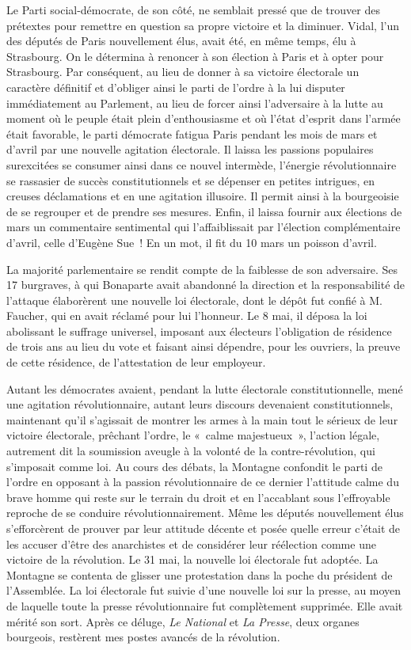 \documentclass[french,twoside]{book} %
\begin{document}
Le Parti social-démocrate, de son côté, ne semblait pressé que de trouver des prétextes pour remettre en question sa propre victoire et la diminuer. Vidal, l’un des députés de Paris nouvellement élus, avait été, en même temps, élu à Strasbourg. On le détermina à renoncer à son élection à Paris et à opter pour Strasbourg. Par conséquent, au lieu de donner à sa victoire électorale un caractère définitif et d’obliger ainsi le parti de l’ordre à la lui disputer immédiatement au Parlement, au lieu de forcer ainsi l’adversaire à la lutte au moment où le peuple était plein d’enthousiasme et où l’état d’esprit dans l’armée était favorable, le parti démocrate fatigua Paris pendant les mois de mars et d’avril par une nouvelle agitation électorale. Il laissa les passions populaires surexcitées se consumer ainsi dans ce nouvel intermède, l’énergie révolutionnaire se rassasier de succès constitutionnels et se dépenser en petites intrigues, en creuses déclamations et en une agitation illusoire. Il permit ainsi à la bourgeoisie de se regrouper et de prendre ses mesures. Enfin, il laissa fournir aux élections de mars un commentaire sentimental qui l’affaiblissait par l’élection complémentaire d’avril, celle d’Eugène Sue ! En un mot, il fit du 10 mars un poisson d’avril.\par
La majorité parlementaire se rendit compte de la faiblesse de son adversaire. Ses 17 burgraves, à qui Bonaparte avait abandonné la direction et la responsabilité de l’attaque élaborèrent une nouvelle loi électorale, dont le dépôt fut confié à M. Faucher, qui en avait réclamé pour lui l’honneur. Le 8 mai, il déposa la loi abolissant le suffrage universel, imposant aux électeurs l’obligation de résidence de trois ans au lieu du vote et faisant ainsi dépendre, pour les ouvriers, la preuve de cette résidence, de l’attestation de leur employeur.\par
Autant les démocrates avaient, pendant la lutte électorale constitutionnelle, mené une agitation révolutionnaire, autant leurs discours devenaient constitutionnels, maintenant qu’il s’agissait de montrer les armes à la main tout le sérieux de leur victoire électorale, prêchant l’ordre, le « calme majestueux », l’action légale, autrement dit la soumission aveugle à la volonté de la contre-révolution, qui s’imposait comme loi. Au cours des débats, la Montagne confondit le parti de l’ordre en opposant à la passion révolutionnaire de ce dernier l’attitude calme du brave homme qui reste sur le terrain du droit et en l’accablant sous l’effroyable reproche de se conduire révolutionnairement. Même les députés nouvellement élus s’efforcèrent de prouver par leur attitude décente et posée quelle erreur c’était de les accuser d’être des anarchistes et de considérer leur réélection comme une victoire de la révolution. Le 31 mai, la nouvelle loi électorale fut adoptée. La Montagne se contenta de glisser une protestation dans la poche du président de l’Assemblée. La loi électorale fut suivie d’une nouvelle loi sur la presse, au moyen de laquelle toute la presse révolutionnaire fut complètement supprimée. Elle avait mérité son sort. Après ce déluge, \emph{Le National} et \emph{La Presse}, deux organes bourgeois, restèrent mes postes avancés de la révolution.\par
\end{document}

